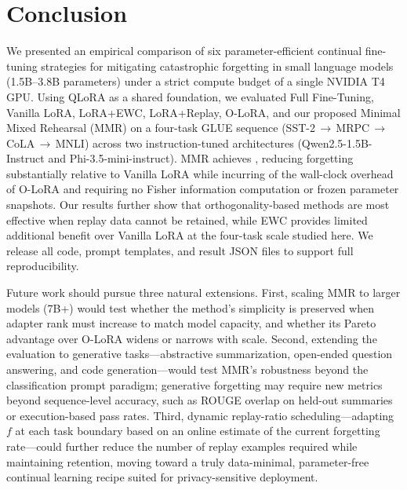 \section{Conclusion}
\label{sec:conclusion}

We presented an empirical comparison of six parameter-efficient continual fine-tuning strategies
for mitigating catastrophic forgetting in small language models (1.5B--3.8B parameters) under a
strict compute budget of a single NVIDIA T4 GPU.
Using QLoRA as a shared foundation, we evaluated Full Fine-Tuning, Vanilla LoRA, LoRA+EWC,
LoRA+Replay, O-LoRA, and our proposed Minimal Mixed Rehearsal (MMR) on a four-task GLUE sequence
(SST-2\,$\to$\,MRPC\,$\to$\,CoLA\,$\to$\,MNLI) across two instruction-tuned architectures
(Qwen2.5-1.5B-Instruct and Phi-3.5-mini-instruct).
MMR achieves , reducing forgetting substantially
relative to Vanilla LoRA while incurring  of the wall-clock overhead of O-LoRA and
requiring no Fisher information computation or frozen parameter snapshots.
Our results further show that orthogonality-based methods are most effective when replay data
cannot be retained, while EWC provides limited additional benefit over Vanilla LoRA at the
four-task scale studied here.
We release all code, prompt templates, and result JSON files to support full reproducibility.

Future work should pursue three natural extensions.
First, scaling MMR to larger models (7B+) would test whether the method's simplicity is preserved
when adapter rank must increase to match model capacity, and whether its Pareto advantage over
O-LoRA widens or narrows with scale.
Second, extending the evaluation to generative tasks---abstractive summarization, open-ended
question answering, and code generation---would test MMR's robustness beyond the classification
prompt paradigm; generative forgetting may require new metrics beyond sequence-level accuracy,
such as ROUGE overlap on held-out summaries or execution-based pass rates.
Third, dynamic replay-ratio scheduling---adapting $f$ at each task boundary based on an online
estimate of the current forgetting rate---could further reduce the number of replay examples
required while maintaining retention, moving toward a truly data-minimal, parameter-free continual
learning recipe suited for privacy-sensitive deployment.
